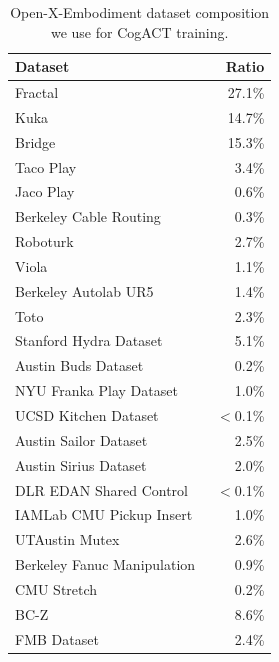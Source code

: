 \begin{table}[htbp]
\centering
    \caption{Open-X-Embodiment dataset composition we use for CogACT training.}
    \label{tab:mixture}
    \begin{tabular}{lr}
    \toprule
     Dataset & Ratio \\
    \midrule
     Fractal~\citep{brohan2022rt} & 27.1\% \\
     Kuka~\citep{kalashnikov2018scalable} & 14.7\% \\
     Bridge~\citep{walke2023bridgedata,Ebert2021BridgeDB} & 15.3\% \\
     Taco Play~\citep{rosete2023latent,mees2023grounding} & 3.4\% \\
     Jaco Play~\citep{dass2023jacoplay} & 0.6\% \\
     Berkeley Cable Routing~\citep{luo2024multi} & 0.3\% \\
     Roboturk~\citep{mandlekar2018roboturk} & 2.7\% \\
     Viola~\citep{zhu2023viola} & 1.1\% \\
     Berkeley Autolab UR5~\citep{BerkeleyUR5Website} & 1.4\% \\
     Toto~\citep{zhou2023train} & 2.3\% \\
     Stanford Hydra Dataset~\citep{belkhale2023hydra} & 5.1\% \\
     Austin Buds Dataset~\citep{zhu2022bottom} & 0.2\% \\
     NYU Franka Play Dataset~\citep{cuiplay} & 1.0\% \\
     UCSD Kitchen Dataset~\citep{ucsdkitchens} & $<$0.1\% \\
     Austin Sailor Dataset~\citep{nasiriany2023learning} & 2.5\% \\
     Austin Sirius Dataset~\citep{liu2022robot} & 2.0\% \\
     DLR EDAN Shared Control~\citep{quere2020shared} & $<$0.1\% \\
     IAMLab CMU Pickup Insert~\citep{saxena2023multi} & 1.0\% \\
     UTAustin Mutex~\citep{shahmutex} & 2.6\% \\
     Berkeley Fanuc Manipulation~\citep{zhu2023fanuc} & 0.9\% \\
     CMU Stretch~\citep{mendoncastructured} & 0.2\% \\
     BC-Z~\citep{jang2022bc} & 8.6\% \\
     FMB Dataset~\citep{luo2023fmb} & 2.4\% \\
    \bottomrule
    \end{tabular}
\end{table}

